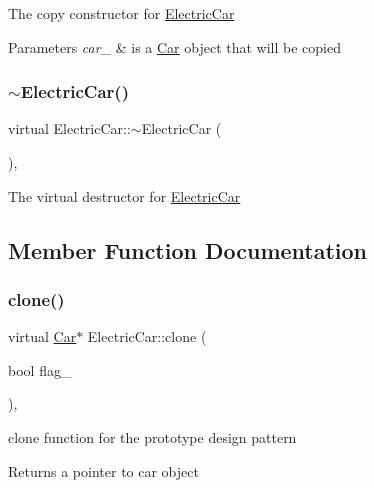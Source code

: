 The copy constructor for \mbox{\hyperlink{class_electric_car}{Electric\+Car}} 
\begin{DoxyParams}{Parameters}
{\em car\+\_\+} & is a \mbox{\hyperlink{class_car}{Car}} object that will be copied \\
\hline
\end{DoxyParams}
\mbox{\label{class_electric_car_afd84f09e8cf25d68770a55580ffad16c}} 
\subsubsection{\texorpdfstring{$\sim$\+Electric\+Car()}{~ElectricCar()}}
{\footnotesize\ttfamily virtual Electric\+Car\+::$\sim$\+Electric\+Car (\begin{DoxyParamCaption}{ }\end{DoxyParamCaption})\hspace{0.3cm}{\ttfamily [inline]}, {\ttfamily [virtual]}}

The virtual destructor for \mbox{\hyperlink{class_electric_car}{Electric\+Car}} 

\subsection{Member Function Documentation}
\mbox{\label{class_electric_car_a852de7d2208dea4d45a554d9270508d0}} 
\subsubsection{\texorpdfstring{clone()}{clone()}}
{\footnotesize\ttfamily virtual \mbox{\hyperlink{class_car}{Car}}$\ast$ Electric\+Car\+::clone (\begin{DoxyParamCaption}\item[{bool}]{flag\+\_\+ }\end{DoxyParamCaption})\hspace{0.3cm}{\ttfamily [inline]}, {\ttfamily [virtual]}}

clone function for the prototype design pattern \begin{DoxyReturn}{Returns}
a pointer to car object 
\end{DoxyReturn}


